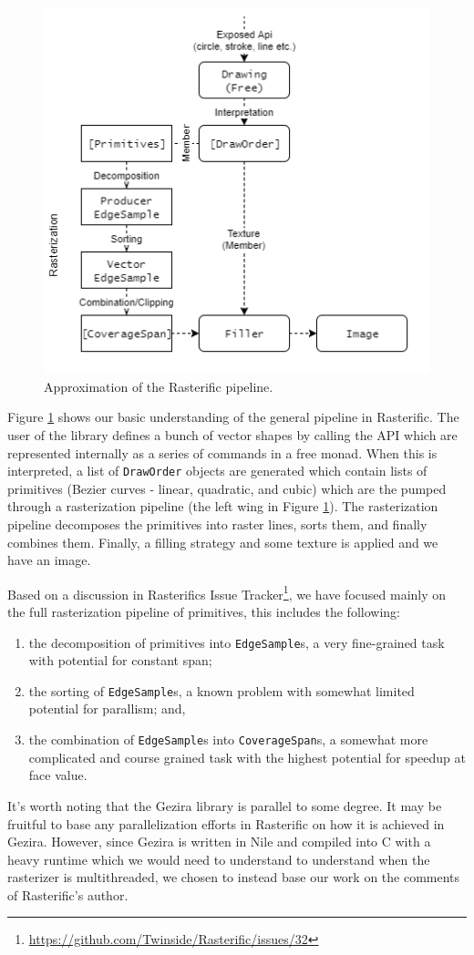 \documentclass[12pt, a4paper]{article}
\begin{document}
\begin{figure}[h!]
  \centering
  \includegraphics[width=.4\linewidth]{../rasterific-pipeline}
  \caption{Approximation of the Rasterific pipeline.}
  \label{fig:rasterific-pipeline}
\end{figure}

Figure \ref{fig:rasterific-pipeline} shows our basic understanding of the general pipeline in Rasterific. The user of the library defines a bunch of vector shapes by calling the
API which are represented internally as a series of commands in a free monad. When this is interpreted, a list of \texttt{DrawOrder} objects are generated which contain lists
of primitives (Bezier curves - linear, quadratic, and cubic) which are the pumped through a rasterization pipeline (the left wing in Figure \ref{fig:rasterific-pipeline}). The rasterization
pipeline decomposes the primitives into raster lines, sorts them, and finally combines them. Finally, a filling strategy and some texture is applied and we have an image.

Based on a discussion in Rasterifics Issue Tracker\footnote{\url{https://github.com/Twinside/Rasterific/issues/32}}, we have focused mainly on the full rasterization pipeline of
primitives, this includes the following:
\begin{enumerate}
\item the decomposition of primitives into \texttt{EdgeSample}s, a very fine-grained task with potential for constant span;
\item the sorting of \texttt{EdgeSample}s, a known problem with somewhat limited potential for parallism; and,
\item the combination of \texttt{EdgeSample}s into \texttt{CoverageSpan}s, a somewhat more complicated and course grained task with the highest potential for speedup at face value.
\end{enumerate}

It's worth noting that the Gezira library is parallel to some degree. It may be fruitful to base any parallelization efforts in Rasterific on how it is achieved in Gezira. However,
since Gezira is written in Nile and compiled into C with a heavy runtime which we would need to understand to understand when the rasterizer is multithreaded, we chosen to instead
 base our work on the comments of Rasterific's author.
\end{document}
